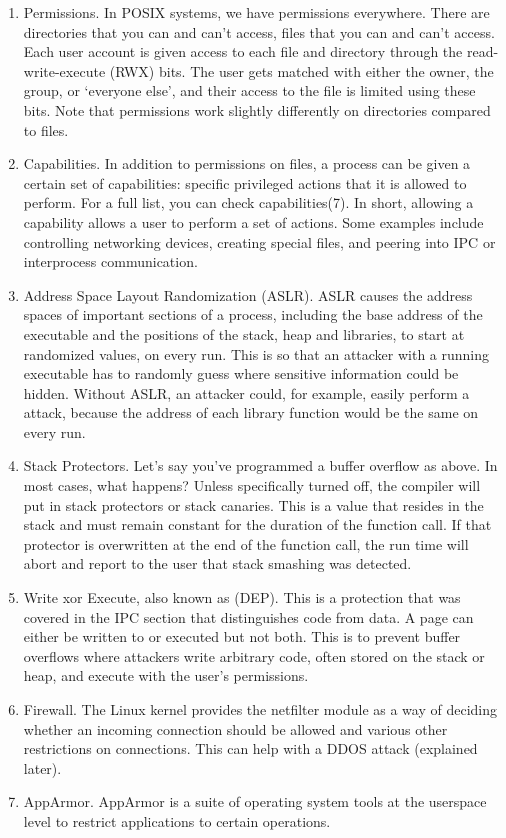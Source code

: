 \begin{enumerate}
\item Permissions.
  In POSIX systems, we have permissions everywhere.
  There are directories that you can and can't access, files that you can and can't access.
  Each user account is given access to each file and directory through the read-write-execute (RWX) bits.
  The user gets matched with either the owner, the group, or `everyone else', and their access to the file is limited using these bits.
  Note that permissions work slightly differently on directories compared to files.
\item Capabilities.
  In addition to permissions on files, a process can be given a certain set of capabilities: specific privileged actions that it is allowed to perform.
  For a full list, you can check capabilities(7).
  In short, allowing a capability allows a user to perform a set of actions.
  Some examples include controlling networking devices, creating special files, and peering into IPC or interprocess communication.
\item Address Space Layout Randomization (ASLR).
  ASLR causes the address spaces of important sections of a process, including the base address of the executable and the positions of the stack, heap and libraries, to start at randomized values, on every run.
  This is so that an attacker with a running executable has to randomly guess where sensitive information could be hidden.
  Without ASLR, an attacker could, for example, easily perform a  attack, because the address of each library function would be the same on every run.
\item Stack Protectors.
  Let's say you've programmed a buffer overflow as above.
  In most cases, what happens?
  Unless specifically turned off, the compiler will put in stack protectors or stack canaries. This is a value that resides in the stack and must remain constant for the duration of the function call. If that protector is overwritten at the end of the function call, the run time will abort and report to the user that stack smashing was detected.
\item Write xor Execute, also known as  (DEP).
  This is a protection that was covered in the IPC section that distinguishes code from data.
  A page can either be written to or executed but not both.
  This is to prevent buffer overflows where attackers write arbitrary code, often stored on the stack or heap, and execute with the user's permissions.
\item Firewall.
  The Linux kernel provides the netfilter module as a way of deciding whether an incoming connection should be allowed and various other restrictions on connections.
  This can help with a DDOS attack (explained later).
\item AppArmor.
  AppArmor is a suite of operating system tools at the userspace level to restrict applications to certain operations.
\end{enumerate}

